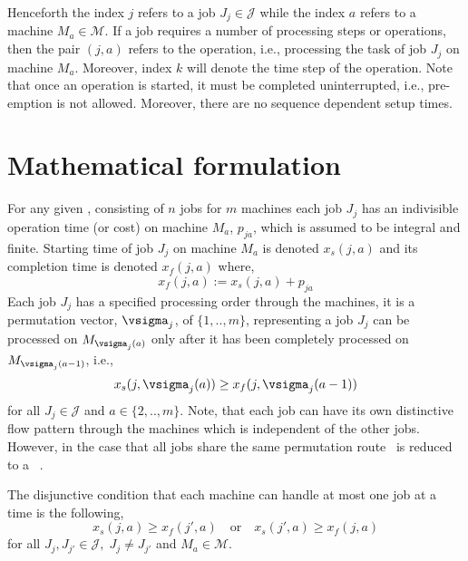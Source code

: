 Henceforth the index $j$ refers to a job $J_j\in\mathcal{J}$ while the index $a$ refers to a machine $M_a\in\mathcal{M}$. If a job requires a number of processing steps or operations, then the pair $(j,a)$ refers to the operation, i.e., processing the task of job $J_j$ on machine $M_a$. Moreover, index $k$ will denote the time step of the operation. Note that once an operation is started, it must be completed uninterrupted, i.e., pre-emption is not allowed. Moreover, there are no sequence dependent setup times.

\section{Mathematical formulation}
For any given \JSP, consisting of $n$ jobs for $m$ machines each job $J_j$ has an indivisible operation time (or cost) on machine $M_a$, $p_{ja}$, which is assumed to be integral and finite. %
Starting time of job $J_j$ on machine $M_a$ is denoted $x_s(j,a)$ and its completion time is denoted $x_f(j,a)$ where, 
\begin{equation}  x_f(j,a):=x_s(j,a)+p_{ja} \end{equation} 
Each job $J_j$ has a specified processing order through the machines, it is a permutation vector, $\vsigma_j$, of $\{1,..,m\}$, representing a job $J_j$ can be processed on $M_{\vsigma_j(a)}$ only after it has been completely processed on $M_{\vsigma_j(a-1)}$, i.e.,
\begin{equation}\label{eq:permutation}
   x_s(j,\vsigma_j(a)) \geq x_f(j,\vsigma_j(a-1)) 
\end{equation}
for all $J_j\in\mathcal{J}$ and $a\in\{2,..,m\}$. 
Note, that each job can have its own distinctive flow pattern through the machines which is independent of the other jobs. However, in the case that all jobs share the same permutation route \JSP\ is reduced to a \FSP\ \citep{Guinet1998,Tay08}.

The disjunctive condition that each machine can handle at most one job at a time is the following,
\begin{equation}\label{eq:oneJobPerMac}
   x_s(j,a) \geq x_f(j',a) \quad\textrm{or}\quad x_s(j',a) \geq x_f(j,a)  
\end{equation}
for all $J_j,J_{j'}\in\mathcal{J},\; J_j\neq J_{j'}$ and $M_a\in\mathcal{M}$. 

